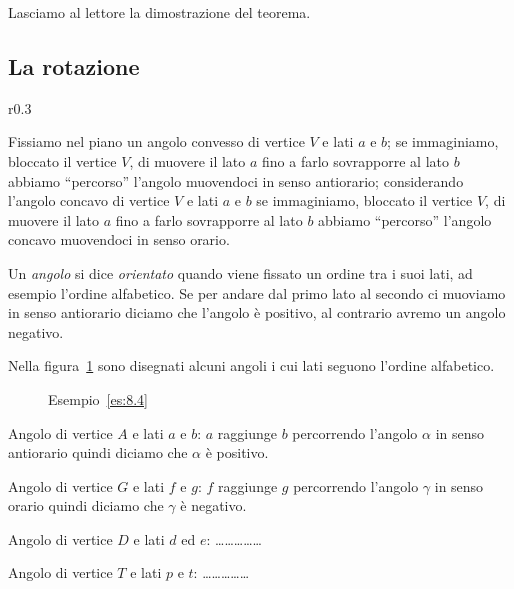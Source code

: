 Lasciamo al lettore la dimostrazione del teorema.

\subsection{La rotazione}

\setlength{\intextsep}{3pt plus 2.0pt minus 2.0pt}
\begin{wrapfigure}{r}{0.3\textwidth}
  \centering
\end{wrapfigure}
Fissiamo nel piano un angolo convesso di vertice $V$ e lati $a$ e 
$b$; se immaginiamo, bloccato il vertice $V$, di muovere il lato $a$ 
fino a farlo sovrapporre al lato $b$ abbiamo ``percorso'' l'angolo 
muovendoci in senso antiorario; considerando l'angolo concavo di 
vertice $V$ e lati $a$ e $b$ se immaginiamo, bloccato il vertice $V$, 
di muovere il lato $a$ fino a farlo sovrapporre al lato $b$ abbiamo 
``percorso'' l'angolo concavo muovendoci in senso orario.

\begin{definizione}
Un \emph{angolo} si dice \emph{orientato} quando viene fissato un 
ordine tra i suoi lati, ad esempio l'ordine alfabetico. Se per andare 
dal primo lato al secondo ci muoviamo in senso antiorario diciamo che 
l'angolo è positivo, al contrario avremo un angolo negativo.
\end{definizione}

\begin{esempio}\label{es:8.4}
Nella figura~\ref{fig:es8.4} sono disegnati alcuni angoli i cui lati 
seguono l'ordine alfabetico.


\begin{inaccessibleblock}
 \begin{figure}[!htb]
  \centering
  \caption{Esempio~\ref{es:8.4}}\label{fig:es8.4}
\end{figure}
\end{inaccessibleblock}
    
\begin{itemize*}
\item Angolo di vertice $A$ e lati $a$ e $b$: $a$ raggiunge $b$ 
percorrendo l'angolo $\alpha$ in senso antiorario quindi diciamo che 
$\alpha$ è positivo.
\item Angolo di vertice $G$ e lati $f$ e $g$: $f$ raggiunge $g$ 
percorrendo l'angolo $\gamma$ in senso orario quindi diciamo che 
$\gamma$ è negativo.
\item Angolo di vertice $D$ e lati $d$ ed $e$: 
\ldots\ldots\ldots\ldots\ldots{}
\item Angolo di vertice $T$ e lati $p$ e $t$: 
\ldots\ldots\ldots\ldots\ldots{}
\end{itemize*}
\end{esempio}
    
